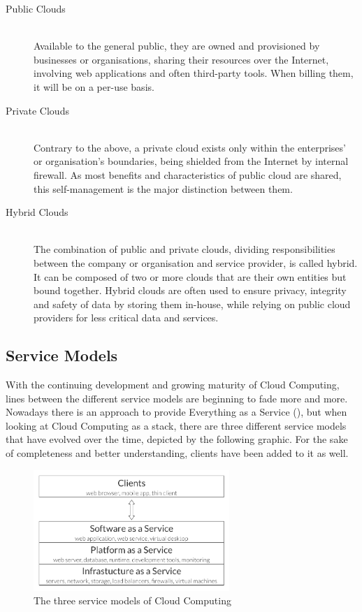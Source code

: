 \begin{description}
	\item[Public Clouds] \hfill \\
		Available to the general public, they are owned and provisioned by businesses or organisations, sharing their resources over the Internet, involving web applications and often third-party tools. When billing them, it will be on a per-use basis.
	\item[Private Clouds] \hfill \\
		Contrary to the above, a private cloud exists only within the enterprises' or organisation's boundaries, being shielded from the Internet by internal firewall. As most benefits and characteristics of public cloud are shared, this self-management is the major distinction between them.
	\item[Hybrid Clouds] \hfill \\
		The combination of public and private clouds, dividing responsibilities between the company or organisation and service provider, is called hybrid. It can be composed of two or more clouds that are their own entities but bound together. Hybrid clouds are often used to ensure privacy, integrity and safety of data by storing them in-house, while relying on public cloud providers for less critical data and services.
\end{description}

\subsection{Service Models}
\label{subsec:cloud-service-models}
With the continuing development and growing maturity of Cloud Computing, lines between the different service models are beginning to fade more and more. Nowadays there is an approach to provide Everything as a Service (), but when looking at Cloud Computing as a stack, there are three different service models that have evolved over the time, depicted by the following graphic. For the sake of completeness and better understanding, clients have been added to it as well.

\begin{figure}[H] %
	\centering
		\includegraphics[width=0.66\textwidth]{images/cc_service_models.pdf}
	\caption{The three service models of Cloud Computing}
\end{figure}

